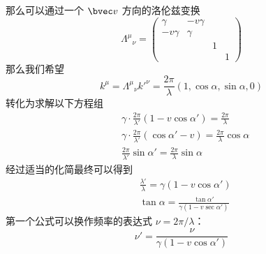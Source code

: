 那么可以通过一个 $\bvec v$ 方向的洛伦兹变换
\begin{equation}
\Lambda^\mu{}_\nu=\begin{pmatrix}
\gamma & -v\gamma &  & \\
-v\gamma & \gamma &  & \\
& & 1 & \\
& & & 1
\end{pmatrix}
\end{equation}
那么我们希望
\begin{equation}
k^\mu = \Lambda^\mu{}_\nu k'^\nu = \frac{2\pi}{\lambda}(1,\cos\alpha,\sin\alpha,0)
\end{equation}
转化为求解以下方程组
\begin{equation}
\begin{aligned}
& \gamma\cdot\frac{2\pi}{\lambda'}\left(1-v\cos\alpha'\right)=\frac{2\pi}{\lambda}\\
& \gamma\cdot\frac{2\pi}{\lambda'}\left(\cos\alpha'-v\right)=\frac{2\pi}{\lambda}\cos\alpha\\
& \frac{2\pi}{\lambda'}\sin\alpha' = \frac{2\pi }{\lambda}\sin\alpha
\end{aligned}
\end{equation}
经过适当的化简最终可以得到
\begin{equation}
\begin{aligned}
&\frac{\lambda'}{\lambda}=\gamma(1-v\cos\alpha')\\
&\tan\alpha=\frac{\tan\alpha'}{\gamma(1-v\sec \alpha')}
\end{aligned}
\end{equation}
第一个公式可以换作频率的表达式 $\nu=2\pi/\lambda$：
\begin{equation}
\nu'=\frac{\nu}{\gamma(1-v\cos\alpha')}
\end{equation}

